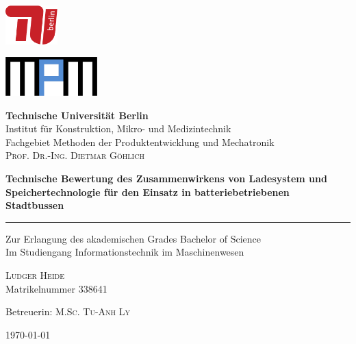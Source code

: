 \documentclass[toc=listof,toc=bib]{scrreprt}
\begin{document}
\begin{titlepage}

\begin{minipage}{0.4\textwidth}
	\begin{flushleft}
		\includegraphics[height=1.5cm]{TU_Logo}
	\end{flushleft}
\end{minipage}
\hfill
\begin{minipage}{0.4\textwidth}
	\begin{flushright}
		\includegraphics[height=1.5cm]{MPM_Logo}%
	\end{flushright}
\end{minipage}
\vfill
\begin{center}    
\textbf{\LARGE Technische Universität Berlin}\\
\large{Institut für Konstruktion, Mikro- und Medizintechnik}\\
\large{Fachgebiet Methoden der Produktentwicklung und Mechatronik}\\
\large{\textsc{Prof. Dr.-Ing. Dietmar Göhlich}}\\
\vfill

\huge{\textbf{Technische Bewertung des Zusammenwirkens von Ladesystem und Speichertechnologie für den Einsatz in batteriebetriebenen Stadtbussen}}\\
\rule{\linewidth}{1pt}
\large{Zur Erlangung des akademischen Grades Bachelor of Science}\\
\large{Im Studiengang Informationstechnik im Maschinenwesen}\\
\vfill

\large{\textsc{Ludger Heide}}\\
\large{Matrikelnummer 338641}\\
\vfill

\large{Betreuerin: \textsc{M.Sc. Tu-Anh Ly}}\\
\vfill

\large{\today}
\end{center}
\end{titlepage}
\end{document}

